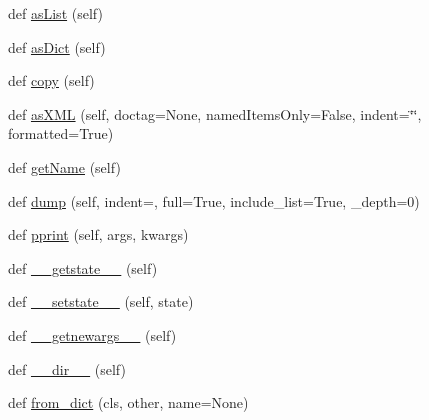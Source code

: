 \begin{DoxyCompactItemize}
\item 
def \hyperlink{classpip_1_1__vendor_1_1pyparsing_1_1ParseResults_a0ab042edd2e7a65684f0c89d7b523f67}{as\+List} (self)
\item 
def \hyperlink{classpip_1_1__vendor_1_1pyparsing_1_1ParseResults_a2a26c1c250002905345967e6cc0bd632}{as\+Dict} (self)
\item 
def \hyperlink{classpip_1_1__vendor_1_1pyparsing_1_1ParseResults_ad78b103022f20dd4457aea6f28db7cf3}{copy} (self)
\item 
def \hyperlink{classpip_1_1__vendor_1_1pyparsing_1_1ParseResults_a5898c1783e968686d2e55c0e72a6031b}{as\+X\+ML} (self, doctag=None, named\+Items\+Only=False, indent=\char`\"{}\char`\"{}, formatted=True)
\item 
def \hyperlink{classpip_1_1__vendor_1_1pyparsing_1_1ParseResults_abce243d73b36a544de185f4fd85f23a6}{get\+Name} (self)
\item 
def \hyperlink{classpip_1_1__vendor_1_1pyparsing_1_1ParseResults_a72363ec5208e922eae5732bf122c0480}{dump} (self, indent=\textquotesingle{}\textquotesingle{}, full=True, include\+\_\+list=True, \+\_\+depth=0)
\item 
def \hyperlink{classpip_1_1__vendor_1_1pyparsing_1_1ParseResults_a60c51a7afb4963efb8671eef18fb66bb}{pprint} (self, args, kwargs)
\item 
def \hyperlink{classpip_1_1__vendor_1_1pyparsing_1_1ParseResults_a6555aad9bdd66a384575141b9b046d6c}{\+\_\+\+\_\+getstate\+\_\+\+\_\+} (self)
\item 
def \hyperlink{classpip_1_1__vendor_1_1pyparsing_1_1ParseResults_af221e40b4b17736ad71fe1fdfd924a0d}{\+\_\+\+\_\+setstate\+\_\+\+\_\+} (self, state)
\item 
def \hyperlink{classpip_1_1__vendor_1_1pyparsing_1_1ParseResults_ab33f578ad7c5a25c9a4242a21b961cbc}{\+\_\+\+\_\+getnewargs\+\_\+\+\_\+} (self)
\item 
def \hyperlink{classpip_1_1__vendor_1_1pyparsing_1_1ParseResults_ac725d8f47eaaf7c5819cc81475ecdbb6}{\+\_\+\+\_\+dir\+\_\+\+\_\+} (self)
\item 
def \hyperlink{classpip_1_1__vendor_1_1pyparsing_1_1ParseResults_ab91e8c6a8caaa242c3d3ba351f551d23}{from\+\_\+dict} (cls, other, name=None)
\end{DoxyCompactItemize}
